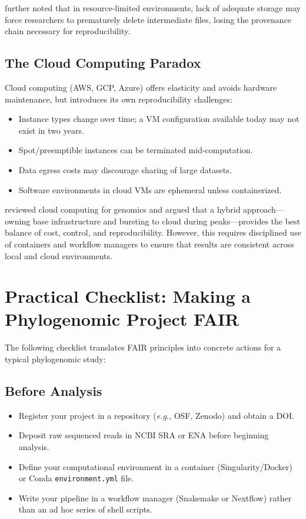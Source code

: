 \textcite{ghedira2024} further noted that in resource-limited environments, lack of adequate storage may force researchers to prematurely delete intermediate files, losing the provenance chain necessary for reproducibility.

\subsection{The Cloud Computing Paradox}

Cloud computing (AWS, GCP, Azure) offers elasticity and avoids hardware maintenance, but introduces its own reproducibility challenges:

\begin{itemize}
\item Instance types change over time; a VM configuration available today may not exist in two years.
\item Spot/preemptible instances can be terminated mid-computation.
\item Data egress costs may discourage sharing of large datasets.
\item Software environments in cloud VMs are ephemeral unless containerized.
\end{itemize}

\textcite{langmead2018} reviewed cloud computing for genomics and argued that a hybrid approach---owning base infrastructure and bursting to cloud during peaks---provides the best balance of cost, control, and reproducibility. However, this requires disciplined use of containers and workflow managers to ensure that results are consistent across local and cloud environments.

\section{Practical Checklist: Making a Phylogenomic Project FAIR}

The following checklist translates FAIR principles into concrete actions for a typical phylogenomic study:

\subsection{Before Analysis}

\begin{itemize}
\item [ ] Register your project in a repository (\textit{e.g.}, OSF, Zenodo) and obtain a DOI.
\item [ ] Deposit raw sequenced reads in NCBI SRA or ENA before beginning analysis.
\item [ ] Define your computational environment in a container (Singularity/Docker) or Conda \texttt{environment.yml} file.
\item [ ] Write your pipeline in a workflow manager (Snakemake or Nextflow) rather than an ad hoc series of shell scripts.
\end{itemize}

